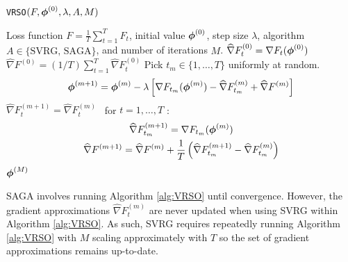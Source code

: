 \begin{algorithm}
\caption{\texttt{VRSO}$(F,\boldsymbol{\phi}^{(0)},\lambda,A,M)$}\label{alg:VRSO}
\begin{algorithmic}[1]
\Require Loss function $F = \frac{1}{T}\sum_{t=1}^T F_t$, initial value $\boldsymbol{\phi}^{(0)}$, step size $\lambda$, algorithm $A \in \{\text{SVRG, SAGA}\}$, and number of iterations $M$.
%
\vspace{5pt}
 
\State $\widehat \nabla F_{t}^{(0)} = \nabla F_t (\boldsymbol{\phi}^{(0)})$
\EndFor
\State $\widehat \nabla F^{(0)} = (1/T) \sum_{t=1}^T \widehat \nabla F_{t}^{(0)}$
%
    \State Pick $t_m \in \{1,\ldots,T\}$ uniformly at random.
    \State {}
    \begin{gather}
        \boldsymbol{\phi}^{(m+1)} = \boldsymbol{\phi}^{(m)} - \lambda \left[\nabla F_{t_m}(\boldsymbol{\phi}^{(m)}) - \widehat \nabla F_{t_m}^{(m)} + \widehat \nabla F^{(m)} \right]
        \label{eqn:SAGA_update0}
    \end{gather}
    \State $\widehat \nabla F_{t}^{(m+1)} = \widehat \nabla F_{t}^{(m)} \enspace$ for $t = 1,\ldots,T$ 
    :
        \begin{gather}
            \widehat \nabla F_{t_m}^{(m+1)} = \nabla F_{t_m}(\boldsymbol{\phi}^{(m)}) \\
            \widehat \nabla F^{(m+1)} = \widehat \nabla F^{(m)} + \frac{1}{T} \left(\widehat \nabla F_{t_m}^{(m+1)} - \widehat \nabla F_{t_m}^{(m)}\right)
        \end{gather}
    \EndIf
\EndFor
\State \Return $\boldsymbol{\phi}^{(M)}$
\end{algorithmic}
\end{algorithm}

SAGA involves running Algorithm \ref{alg:VRSO} until convergence. However, the gradient approximations $\widehat \nabla F_{t}^{(m)}$ are never updated when using SVRG within Algorithm \ref{alg:VRSO}. As such, SVRG requires repeatedly running Algorithm \ref{alg:VRSO} with $M$ scaling approximately with $T$ so the set of gradient approximations remains up-to-date.